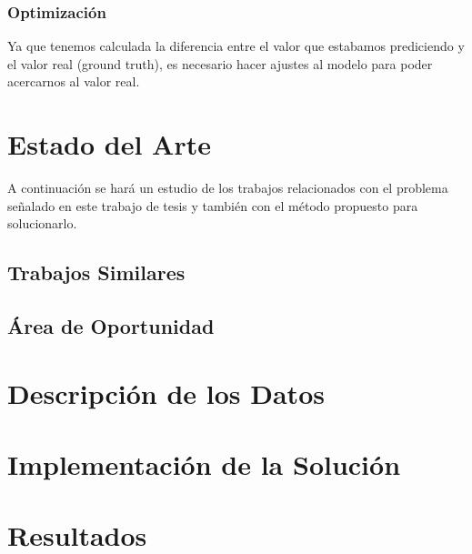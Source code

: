 \subsection{Optimización}
Ya que tenemos calculada la diferencia entre el valor que estabamos prediciendo y el valor real (ground truth), es necesario hacer ajustes al modelo para poder acercarnos al valor real. 

\chapter{Estado del Arte}
A continuación se hará un estudio de los trabajos relacionados con el problema señalado en este trabajo de tesis y también con el método propuesto para solucionarlo.

\section{Trabajos Similares}

\section{Área de Oportunidad}

\chapter{Descripción de los Datos}

\chapter{Implementación de la Solución}

\chapter{Resultados}


